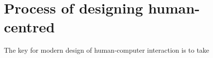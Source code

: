 \chapter{Process of designing human-centred} \label{chap:process}
The key for modern design of human-computer interaction is to take 




